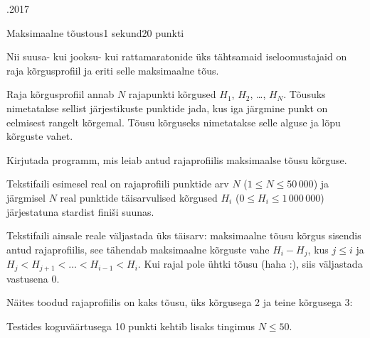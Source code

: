 \documentclass[a4paper,11pt]{article}
\begin{document}
\begin{ol}{\eio}{.2017}{\yle}{}
\begin{yl}{1}{Maksimaalne tõus}{tous}{1 sekund}{20 punkti}

Nii suusa- kui jooksu- kui rattamaratonide üks tähtsamaid iseloomustajaid on raja kõrgusprofiil ja eriti selle maksimaalne tõus.

Raja kõrgusprofiil annab $N$ rajapunkti kõrgused $H_1$, $H_2$, \dots, $H_N$. Tõusuks nimetatakse sellist järjestikuste punktide jada, kus iga järgmine punkt on eelmisest rangelt kõrgemal. Tõusu kõrguseks nimetatakse selle alguse ja lõpu kõrguste vahet.

Kirjutada programm, mis leiab antud rajaprofiilis maksimaalse tõusu kõrguse.

\sis Tekstifaili \sisf esimesel real on rajaprofiili punktide arv $N$ ($1 \le N \le 50\,000$) ja järgmisel $N$ real punktide täisarvulised kõrgused $H_i$ ($0 \le H_i \le 1\,000\,000$) järjestatuna stardist finiši suunas.

\val Tekstifaili \valf ainsale reale väljastada üks täisarv: maksimaalne tõusu kõrgus sisendis antud rajaprofiilis, see tähendab maksimaalne kõrguste vahe $H_i - H_j$, kus $j \le i$ ja $H_j < H_{j+1} < \dots < H_{i-1} < H_i$. Kui rajal pole ühtki tõusu (haha :), siis väljastada vastusena 0.

\nde[0]{3cm}{3cm}

Näites toodud rajaprofiilis on kaks tõusu, üks kõrgusega 2 ja teine kõrgusega 3:


\hnd Testides koguväärtusega 10 punkti kehtib lisaks tingimus $N \le 50$.

\end{yl}
\end{ol}
\end{document}
